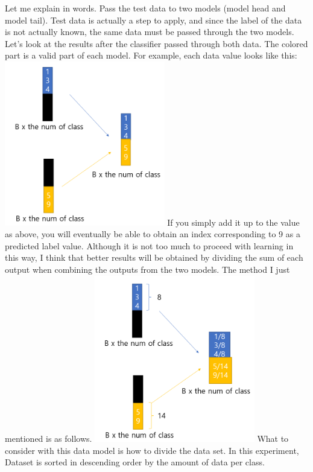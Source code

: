 \documentclass[extendedabs]{bmvc2k}
\begin{document}
    Let me explain in words. Pass the test data to two models (model head and model tail). Test data is actually a step to apply,
    and since the label of the data is not actually known, the same data must be passed through the two models. Let's look at the results 
    after the classifier passed through both data. The colored part is a valid part of each model. For example, each data value looks like this:
    \newline  \includegraphics[width=7cm]{images/06_project.PNG}
    \newline If you simply add it up to the value as above, you will eventually be able to obtain an index corresponding to 9 as a predicted label value. 
    Although it is not too much to proceed with learning in this way, I think that better results will be obtained by dividing the sum of each output 
    when combining the outputs from the two models. The method I just mentioned is as follows.
    \newline  \includegraphics[width=7cm]{images/07_project.PNG}
    \newline What to consider with this data model is how to divide the data set. In this experiment, Dataset is sorted in descending order by the amount of data per class. 
\end{document}

